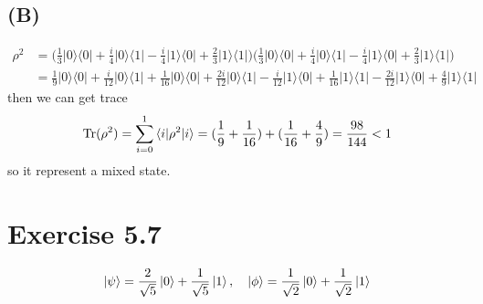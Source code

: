 \documentclass{article}
\newcommand{\op}[2]{|#1\rangle \langle#2|}
\newcommand{\sand}[3]{\braket{#1 | #2 | #3}}
\begin{document}
\subsection*{(B)}
\begin{align*}
    \rho^2 &=  \big(\frac{1}{3}\op{0}{0} + \frac{i}{4}\op{0}{1} - \frac{i}{4}\op{1}{0} + \frac{2}{3}\op{1}{1}\big)\big(\frac{1}{3}\op{0}{0} + \frac{i}{4}\op{0}{1} - \frac{i}{4}\op{1}{0} + \frac{2}{3}\op{1}{1}\big) \\
    &= \frac{1}{9}\op{0}{0} +  \frac{i}{12}\op{0}{1} + \frac{1}{16}\op{0}{0} + \frac{2i}{12}\op{0}{1} - \frac{i}{12}\op{1}{0} + \frac{1}{16}\op{1}{1} - \frac{2i}{12}\op{1}{0} + \frac{4}{9}\op{1}{1}
\end{align*}
then we can get trace 
\begin{align*}
    \text{Tr}(\rho^2) = \sum_{i=0}^{1} \sand{i}{\rho^2}{i} = (\frac{1}{9} + \frac{1}{16}) + (\frac{1}{16} + \frac{4}{9}) = \frac{98}{144} < 1
\end{align*}
so it represent a mixed state.
\section*{Exercise 5.7}
\begin{align*}
    \ket{\psi} = \frac{2}{\sqrt{5}}\ket{0} + \frac{1}{\sqrt{5}}\ket{1},\quad \ket{\phi} = \frac{1}{\sqrt{2}}\ket{0} + \frac{1}{\sqrt{2}}\ket{1}
\end{align*}
\end{document}
